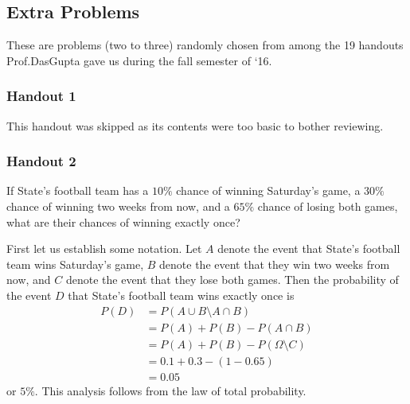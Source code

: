 \subsection{Extra Problems}
These are problems (two to three) randomly chosen from among the 19
handouts Prof.\@ DasGupta gave us during the fall semester of `16.
\subsubsection{Handout 1}
This handout was skipped as its contents were too basic to bother
reviewing.
\subsubsection{Handout 2}
\begin{problem}[Handout 2, \# 3]
  If State's football team has a \(10\%\) chance of winning Saturday's
  game, a \(30\%\) chance of winning two weeks from now, and a \(65\%\)
  chance of losing both games, what are their chances of winning exactly
  once?
\end{problem}
\begin{solution*}
  First let us establish some notation. Let \(A\) denote the event that
  State's football team wins Saturday's game, \(B\) denote the event that
  they win two weeks from now, and \(C\) denote the event that they lose
  both games. Then the probability of the event \(D\) that State's football
  team wins exactly once is
  \begin{align*}
    P(D)
    &=P(A\cup B\setminus A\cap B)\\
    &=P(A)+P(B)-P(A\cap B)\\
    &=P(A)+P(B)-P(\Omega\setminus C)\\
    &=0.1+0.3-(1-0.65)\\
    &=0.05
  \end{align*}
  or \(5\%\). This analysis follows from the law of total probability.
\end{solution*}


